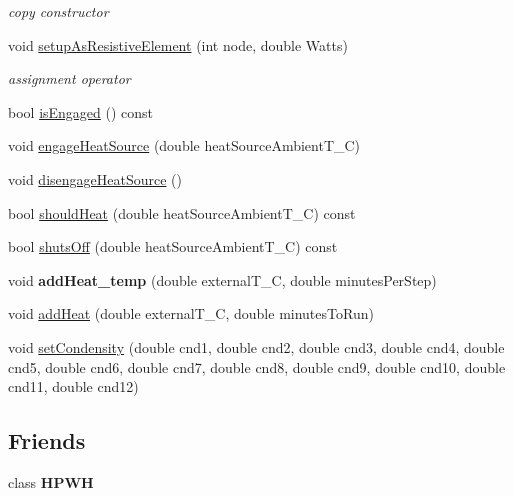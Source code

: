 \begin{DoxyCompactItemize}
\begin{DoxyCompactList}\small\item\em copy constructor \end{DoxyCompactList}\item 
void \hyperlink{class_h_p_w_h_1_1_heat_source_abc4bca8cd776b2d3fe82e5ed4ee679a5}{setup\-As\-Resistive\-Element} (int node, double Watts)
\begin{DoxyCompactList}\small\item\em assignment operator \end{DoxyCompactList}\item 
bool \hyperlink{class_h_p_w_h_1_1_heat_source_a0c06eacf6cb6812126674dd3f646be61}{is\-Engaged} () const 
\item 
void \hyperlink{class_h_p_w_h_1_1_heat_source_a39cfd8ab58d7bdf0aa6d40d4fa9c2f03}{engage\-Heat\-Source} (double heat\-Source\-Ambient\-T\-\_\-\-C)
\item 
void \hyperlink{class_h_p_w_h_1_1_heat_source_af04d8398bdc78e0eea8e06496b2cd174}{disengage\-Heat\-Source} ()
\item 
bool \hyperlink{class_h_p_w_h_1_1_heat_source_ac60987b0b6c963c08d5a5fe34e8232e9}{should\-Heat} (double heat\-Source\-Ambient\-T\-\_\-\-C) const 
\item 
bool \hyperlink{class_h_p_w_h_1_1_heat_source_a1e2ca52b1de7c4bc660a9222bec44163}{shuts\-Off} (double heat\-Source\-Ambient\-T\-\_\-\-C) const 
\item 
\hypertarget{class_h_p_w_h_1_1_heat_source_ae17b2ad3d73e7dd833f6575936dfabd8}{void {\bfseries add\-Heat\-\_\-temp} (double external\-T\-\_\-\-C, double minutes\-Per\-Step)}\label{class_h_p_w_h_1_1_heat_source_ae17b2ad3d73e7dd833f6575936dfabd8}

\item 
void \hyperlink{class_h_p_w_h_1_1_heat_source_a75908e3dfbce9d6836719733225418f3}{add\-Heat} (double external\-T\-\_\-\-C, double minutes\-To\-Run)
\item 
void \hyperlink{class_h_p_w_h_1_1_heat_source_a9953690abd78b326db6a03b2d028bb1b}{set\-Condensity} (double cnd1, double cnd2, double cnd3, double cnd4, double cnd5, double cnd6, double cnd7, double cnd8, double cnd9, double cnd10, double cnd11, double cnd12)
\end{DoxyCompactItemize}
\subsection*{Friends}
\begin{DoxyCompactItemize}
\item 
\hypertarget{class_h_p_w_h_1_1_heat_source_a47b61ec8aa0058a6a95d9f87212cec07}{class {\bfseries H\-P\-W\-H}}\label{class_h_p_w_h_1_1_heat_source_a47b61ec8aa0058a6a95d9f87212cec07}

\end{DoxyCompactItemize}


